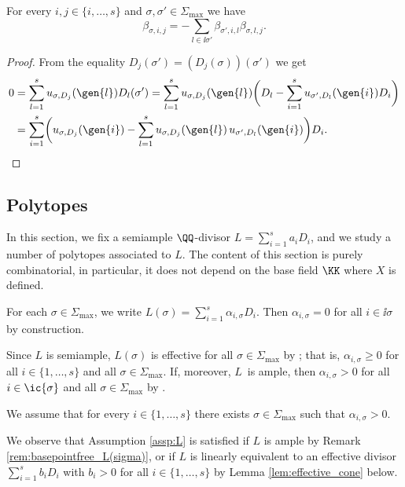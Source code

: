 \begin{lemma}
\label{lem:relation_beta_sigma_sigma'}
For every $i,j\in\{i,\dots,s\}$ and $\sigma,\sigma'\in\Sigma_{\max}$ we have
\[
\beta_{\sigma, i,j}
=-\sum_{l\in \ii{\sigma'}}\beta_{\sigma', i, l}\beta_{\sigma, l, j}.
\]
\end{lemma}
\begin{proof}
From the equality $D_{j}(\sigma')=(D_{j}(\sigma))(\sigma')$
we get
\begin{align*}
0&= \sum_{l=1}^s u_{\sigma,D_{j}}(\gen{l})D_{l}(\sigma')
= \sum_{l=1}^s u_{\sigma,D_{j}}(\gen{l})\biggl(D_{l}-\sum_{i=1}^s u_{\sigma',D_{l}}(\gen{i})D_i\biggr)\\
&=\sum_{i=1}^s\biggl(u_{\sigma,D_{j}}(\gen{i})
- \sum_{l=1}^s u_{\sigma,D_{j}}(\gen{l})\, u_{\sigma',D_{l}}(\gen{i})\biggr)D_i.
\qedhere
\end{align*}
\end{proof}

\subsection{Polytopes}
\label{sec:polytopes_toric}

In this section, we fix a semiample $\QQ$-divisor $L=\sum_{i=1}^s a_i D_i$,
and we study a number of polytopes associated to $L$.
The content of this section is purely combinatorial,
in particular, it does not depend on the base field $\KK$ where $X$ is defined.

For each $\sigma\in\Sigma_{\max}$, we write $L(\sigma)=\sum_{i=1}^s\alpha_{i, \sigma}D_i$.
Then $\alpha_{i,\sigma}=0$ for all $i\in\ii{\sigma}$ by construction.
\begin{remark}
\label{rem:basepointfree_L(sigma)}
Since $L$ is semiample, $L(\sigma)$ is effective for all $\sigma\in\Sigma_{\max}$
by \cite[Prop.\,6.1.1]{MR2810322}; that is, $\alpha_{i,\sigma}\geq0$ for all
$i\in\{1,\dots,s\}$ and all $\sigma\in\Sigma_{\max}$.
If, moreover, $L$~is ample, then $\alpha_{i,\sigma}>0$ for all $i\in\ic{\sigma}$ and
all $\sigma\in\Sigma_{\max}$ by \cite[Th.\,6.1.14]{MR2810322}.
\end{remark}

\begin{assumption}
\label{assp:L}
We assume that for every $i\in\{1,\dots,s\}$ there exists $\sigma\in\Sigma_{\max}$
such that $\alpha_{i,\sigma}>0$.
\end{assumption}

We observe that Assumption \ref{assp:L} is satisfied
if $L$ is ample by Remark \ref{rem:basepointfree_L(sigma)},
or if $L$ is linearly equivalent to an effective divisor
$\sum_{i=1}^s b_i D_i$ with $b_i>0$ for all $i\in\{1,\dots,s\}$
by Lemma \ref{lem:effective_cone} below.

